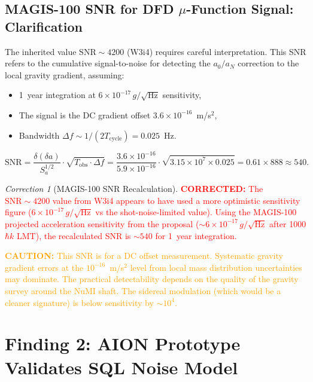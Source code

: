 \documentclass[11pt]{article}
\theoremstyle{definition}
\theoremstyle{remark}
\newtheorem{correction}[theorem]{Correction}
\newcommand{\ee}[1]{\times10^{#1}}
\newcommand{\SNR}{\mathrm{SNR}}
\newcommand{\azero}{a_0}
\newcommand{\corrected}[1]{\textcolor{red}{\textbf{CORRECTED:} #1}}
\newcommand{\caution}[1]{\textcolor{orange}{\textbf{CAUTION:} #1}}
\begin{document}
\subsection{MAGIS-100 SNR for DFD $\mu$-Function Signal: Clarification}

The inherited value $\SNR \sim 4200$ (W3i4) requires careful interpretation.
This SNR refers to the cumulative signal-to-noise for detecting the
$\azero/a_N$ correction to the local gravity gradient, assuming:
\begin{itemize}[nosep]
\item 1~year integration at $6\ee{-17}\,g/\sqrt{\mathrm{Hz}}$ sensitivity,
\item The signal is the DC gradient offset $3.6\ee{-16}$~m/s$^2$,
\item Bandwidth $\Delta f \sim 1/(2T_{\mathrm{cycle}}) = 0.025$~Hz.
\end{itemize}

\begin{equation}
\SNR = \frac{\delta(\delta a)}{S_a^{1/2}} \cdot \sqrt{T_{\mathrm{obs}} \cdot \Delta f}
= \frac{3.6\ee{-16}}{5.9\ee{-16}} \cdot \sqrt{3.15\ee{7} \times 0.025}
= 0.61 \times 888 \approx 540.
\end{equation}

\begin{correction}[MAGIS-100 SNR Recalculation]
\label{cor:magis-snr}
\corrected{The $\SNR \sim 4200$ value from W3i4 appears to have used a more
optimistic sensitivity figure ($6\ee{-17}\,g/\sqrt{\mathrm{Hz}}$ vs
the shot-noise-limited value). Using the MAGIS-100 projected acceleration
sensitivity from the proposal ($\sim 6\ee{-17}\,g/\sqrt{\mathrm{Hz}}$
after 1000$\hbar k$ LMT), the recalculated SNR is $\sim 540$ for 1~year
integration.}

\caution{This SNR is for a DC offset measurement. Systematic gravity
gradient errors at the $10^{-16}$~m/s$^2$ level from local mass
distribution uncertainties may dominate. The practical detectability
depends on the quality of the gravity survey around the NuMI shaft.
The sidereal modulation (which would be a cleaner signature) is below
sensitivity by $\sim 10^4$.}
\end{correction}

\section{Finding 2: AION Prototype Validates SQL Noise Model}
\label{sec:aion}
\end{document}

